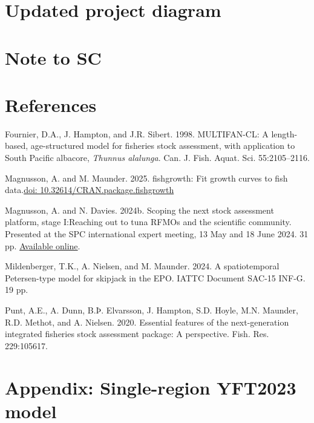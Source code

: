 \documentclass{SCreport}
\newcommand\blob
{https://github.com/PacificCommunity/ofp-sam-transition-plan/blob/main}
\newcommand\present{\blob/presentations}
\begin{document}
\section{Updated project diagram}

\section{Note to SC}

\section{References}

\sloppy\setlength{}

\begin{description}\setlength\itemsep{0ex}
  \item Fournier, D.A., J. Hampton, and J.R. Sibert. 1998. MULTIFAN-CL: A
  length-based, age-structured model for fisheries stock assessment, with
  application to South Pacific albacore, \textit{Thunnus alalunga}. Can. J.
  Fish. Aquat. Sci. 55:2105--2116.
  \item Magnusson, A. and M. Maunder. 2025. fishgrowth: Fit growth curves to
  fish data.\linebreak \href{https://doi.org/10.32614/CRAN.package.fishgrowth}
  {doi: 10.32614/CRAN.package.fishgrowth}
  \item Magnusson, A. and N. Davies. 2024b. Scoping the next stock assessment
  platform, stage I:\linebreak Reaching out to tuna RFMOs and the scientific
  community. Presented at the SPC international expert meeting, 13 May and 18
  June 2024. 31 pp.
  \href{\present/2024_05_13_experts_scoping/2024_05_13_experts_scoping.pdf}
  {Available online}.
  \item Mildenberger, T.K., A. Nielsen, and M. Maunder. 2024. A spatiotemporal
  Petersen-type model for skipjack in the EPO. IATTC Document SAC-15 INF-G. 19
  pp.
  \item Punt, A.E., A. Dunn, B.Þ. Elvarsson, J. Hampton, S.D. Hoyle, M.N.
  Maunder, R.D. Methot, and A. Nielsen. 2020. Essential features of the
  next-generation integrated fisheries stock assessment package: A perspective.
  Fish. Res. 229:105617.
\end{description}

\newpage

\appendix

\section{Appendix: Single-region YFT2023 model}
\label{sec:yft-mfcl}
\end{document}
